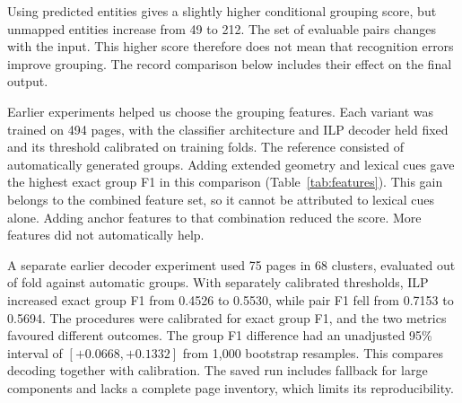 \begin{table}[htbp]
\centering\small
\caption{All rows are evaluated against human-annotated offer groups. The first two use identical human-annotated entities and compare grouping alone. The third uses LayoutXLM predictions. Unmapped entities cannot be assigned to the grouping reference. Intervals are individual 95\% intervals, with no separate paired test.}\label{tab:grouping}

\end{table}

Using predicted entities gives a slightly higher conditional grouping score, but unmapped entities increase from 49 to 212. The set of evaluable pairs changes with the input. This higher score therefore does not mean that recognition errors improve grouping. The record comparison below includes their effect on the final output.

Earlier experiments helped us choose the grouping features. Each variant was trained on 494 pages, with the classifier architecture and ILP decoder held fixed and its threshold calibrated on training folds. The reference consisted of automatically generated groups. Adding extended geometry and lexical cues gave the highest exact group F1 in this comparison (Table~\ref{tab:features}). This gain belongs to the combined feature set, so it cannot be attributed to lexical cues alone. Adding anchor features to that combination reduced the score. More features did not automatically help.

\begin{table}[htbp]
\centering\footnotesize
\caption{Earlier feature comparison on 56 development pages in 25 clusters, against automatic annotations. Each variant was retrained and calibrated. Difference intervals use 1,000 bootstrap resamples without correction for multiple comparisons.}\label{tab:features}

\end{table}

A separate earlier decoder experiment used 75 pages in 68 clusters, evaluated out of fold against automatic groups. With separately calibrated thresholds, ILP increased exact group F1 from 0.4526 to 0.5530, while pair F1 fell from 0.7153 to 0.5694. The procedures were calibrated for exact group F1, and the two metrics favoured different outcomes. The group F1 difference had an unadjusted 95\% interval of $[+0.0668,+0.1332]$ from 1,000 bootstrap resamples. This compares decoding together with calibration. The saved run includes fallback for large components and lacks a complete page inventory, which limits its reproducibility.

